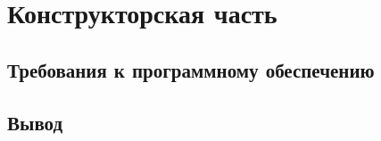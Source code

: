 \chapter{Конструкторская часть}


\section{Требования к программному обеспечению}

\section{Вывод}

